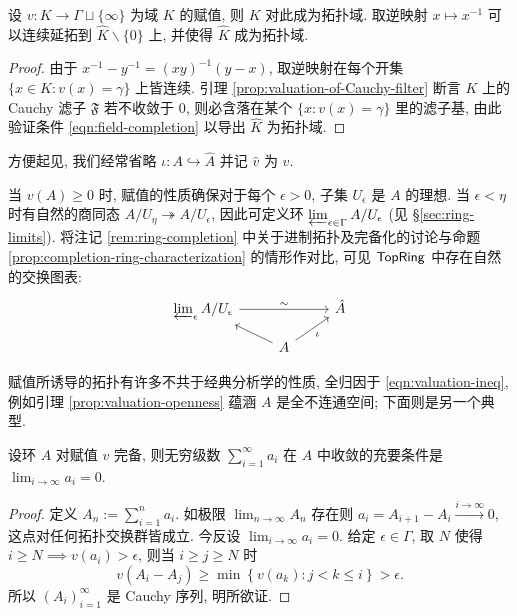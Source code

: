 \begin{proposition}\label{prop:completion-valued-field}
	设 $v: K \to \Gamma \sqcup \{\infty\}$ 为域 $K$ 的赋值, 则 $K$ 对此成为拓扑域. 取逆映射 $x \mapsto x^{-1}$ 可以连续延拓到 $\hat{K} \smallsetminus \{0\}$ 上, 并使得 $\hat{K}$ 成为拓扑域.
\end{proposition}
\begin{proof}
	由于 $x^{-1} - y^{-1} = (xy)^{-1}(y-x)$, 取逆映射在每个开集 $\{x \in K: v(x)=\gamma \}$ 上皆连续. 引理 \ref{prop:valuation-of-Cauchy-filter} 断言 $K$ 上的 Cauchy 滤子 $\mathfrak{F}$ 若不收敛于 $0$, 则必含落在某个 $\{x: v(x) = \gamma \}$ 里的滤子基, 由此验证条件 \eqref{eqn:field-completion} 以导出 $\hat{K}$ 为拓扑域.
\end{proof}

方便起见, 我们经常省略 $\iota: A \hookrightarrow \hat{A}$ 并记 $\hat{v}$ 为 $v$.
\begin{remark}
	当 $v(A) \geq 0$ 时, 赋值的性质确保对于每个 $\epsilon > 0$, 子集 $U_\epsilon$ 是 $A$ 的理想. 当 $\epsilon < \eta$ 时有自然的商同态 $A/U_\eta \twoheadrightarrow A/U_\epsilon$, 因此可定义环 $\varprojlim_{\epsilon \in \Gamma} A/U_\epsilon$ (见 \S\ref{sec:ring-limits}). 将注记 \ref{rem:ring-completion} 中关于进制拓扑及完备化的讨论与命题 \ref{prop:completion-ring-characterization} 的情形作对比, 可见 $\mathsf{TopRing}$ 中存在自然的交换图表:
	\begin{equation}\label{eqn:completion-ring-via-ideals} \begin{tikzcd}[row sep=small]
		\varprojlim_\epsilon A/U_\epsilon \arrow[rr, "\sim"] & & \hat{A} \\
		{} & A \arrow[lu] \arrow[ru, "\iota"'] &
	\end{tikzcd}\end{equation}
\end{remark}

赋值所诱导的拓扑有许多不共于经典分析学的性质, 全归因于 \eqref{eqn:valuation-ineq}, 例如引理 \ref{prop:valuation-openness} 蕴涵 $A$ 是全不连通空间; 下面则是另一个典型.
\begin{proposition}\label{prop:ultrametric-series}
	设环 $A$ 对赋值 $v$ 完备, 则无穷级数 $\sum_{i=1}^\infty a_i$ 在 $A$ 中收敛的充要条件是 $\lim_{i \to \infty} a_i = 0$.
\end{proposition}
\begin{proof}
	定义 $A_n := \sum_{i=1}^n a_i$. 如极限 $\displaystyle\lim_{n \to \infty} A_n$ 存在则 $a_i = A_{i+1} - A_i \xrightarrow{i \to \infty} 0$, 这点对任何拓扑交换群皆成立. 今反设 $\displaystyle\lim_{i \to \infty} a_i = 0$. 给定 $\epsilon \in \Gamma$, 取 $N$ 使得 $i \geq N \implies v(a_i) > \epsilon$, 则当 $i \geq j \geq N$ 时
	\[ v(A_i - A_j) \geq \min\left\{ v(a_k) : j < k \leq i \right\} > \epsilon. \]
	所以 $(A_i)_{i=1}^\infty$ 是 Cauchy 序列, 明所欲证.
\end{proof}

